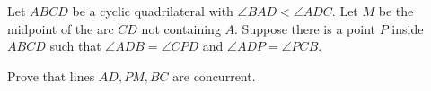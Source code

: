 Let $ABCD$ be a cyclic quadrilateral with $\angle BAD < \angle ADC$. Let $M$ be the midpoint of the arc $CD$ not containing $A$. Suppose there is a point $P$ inside $ABCD$ such that $\angle ADB = \angle CPD$ and $\angle ADP = \angle PCB$.

Prove that lines $AD, PM, BC$ are concurrent.
